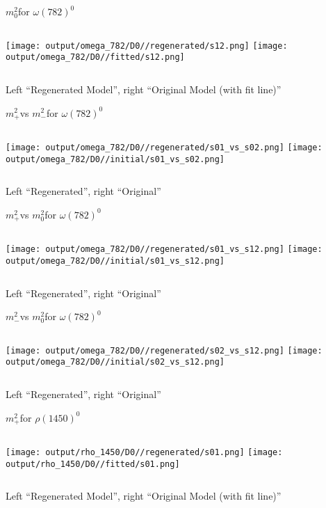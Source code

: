 \documentclass{beamer}
\newcommand{\MP}{\ensuremath{m^2_+}}
\newcommand{\MM}{\ensuremath{m^2_-}}
\newcommand{\MZ}{\ensuremath{m^2_0}}
\begin{document}
\begin{frame}{\MZ for $\omega(782)^0$}
\begin{columns}[t]
\centering
\texttt{[image: output/omega\_782/D0//regenerated/s12.png]}
\centering
\texttt{[image: output/omega\_782/D0//fitted/s12.png]}
\end{columns}
    \centering
    Left ``Regenerated Model'', right ``Original Model (with fit line)''
\end{frame}                   


\begin{frame}{\MP vs \MM for $\omega(782)^0$}
\begin{columns}[t]
\centering
\texttt{[image: output/omega\_782/D0//regenerated/s01\_vs\_s02.png]}
\centering
\texttt{[image: output/omega\_782/D0//initial/s01\_vs\_s02.png]}
\end{columns}
    \centering
    Left ``Regenerated'', right ``Original''
\end{frame} 


\begin{frame}{\MP vs \MZ for $\omega(782)^0$}
\begin{columns}[t]
\centering
\texttt{[image: output/omega\_782/D0//regenerated/s01\_vs\_s12.png]}
\centering
\texttt{[image: output/omega\_782/D0//initial/s01\_vs\_s12.png]}
\end{columns}
    \centering
    Left ``Regenerated'', right ``Original''
\end{frame} 


\begin{frame}{\MM vs \MZ for $\omega(782)^0$}
\begin{columns}[t]
\centering
\texttt{[image: output/omega\_782/D0//regenerated/s02\_vs\_s12.png]}
\centering
\texttt{[image: output/omega\_782/D0//initial/s02\_vs\_s12.png]}
\end{columns}
    \centering
    Left ``Regenerated'', right ``Original''
\end{frame} 

\begin{frame}{\MP for $\rho(1450)^0$}
\begin{columns}[t]
\centering
\texttt{[image: output/rho\_1450/D0//regenerated/s01.png]}
\centering
\texttt{[image: output/rho\_1450/D0//fitted/s01.png]}
\end{columns}
    \centering
    Left ``Regenerated Model'', right ``Original Model (with fit line)''
\end{frame}                   
\end{document}
